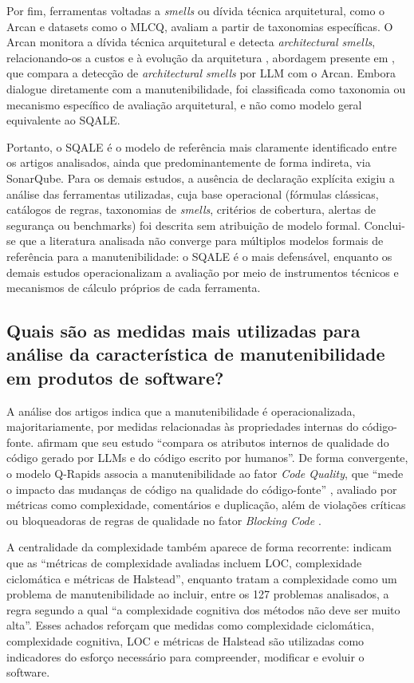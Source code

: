 Por fim, ferramentas voltadas a \textit{smells} ou dívida técnica arquitetural, como o Arcan e datasets como o MLCQ, avaliam a partir de taxonomias específicas. O Arcan monitora a dívida técnica arquitetural e detecta \textit{architectural smells}, relacionando-os a custos e à evolução da arquitetura \cite{arcan2025}, abordagem presente em , que compara a detecção de \textit{architectural smells} por LLM com o Arcan. Embora dialogue diretamente com a manutenibilidade, foi classificada como taxonomia ou mecanismo específico de avaliação arquitetural, e não como modelo geral equivalente ao SQALE.

Portanto, o SQALE é o modelo de referência mais claramente identificado entre os artigos analisados, ainda que predominantemente de forma indireta, via SonarQube. Para os demais estudos, a ausência de declaração explícita exigiu a análise das ferramentas utilizadas, cuja base operacional (fórmulas clássicas, catálogos de regras, taxonomias de \textit{smells}, critérios de cobertura, alertas de segurança ou benchmarks) foi descrita sem atribuição de modelo formal. Conclui-se que a literatura analisada não converge para múltiplos modelos formais de referência para a manutenibilidade: o SQALE é o mais defensável, enquanto os demais estudos operacionalizam a avaliação por meio de instrumentos técnicos e mecanismos de cálculo próprios de cada ferramenta.

\subsection{Quais são as medidas mais utilizadas para análise da característica de manutenibilidade em produtos de software?}

A análise dos artigos indica que a manutenibilidade é operacionalizada, majoritariamente, por medidas relacionadas às propriedades internas do código-fonte.  afirmam que seu estudo ``compara os atributos internos de qualidade do código gerado por LLMs e do código escrito por humanos''. De forma convergente, o modelo Q-Rapids associa a manutenibilidade ao fator \textit{Code Quality}, que ``mede o impacto das mudanças de código na qualidade do código-fonte'' \cite[p.~10, tradução nossa]{qrapids2019}, avaliado por métricas como complexidade, comentários e duplicação, além de violações críticas ou bloqueadoras de regras de qualidade no fator \textit{Blocking Code} \cite[p.~5]{qrapids2019}.

A centralidade da complexidade também aparece de forma recorrente:  indicam que as ``métricas de complexidade avaliadas incluem LOC, complexidade ciclomática e métricas de Halstead'', enquanto  tratam a complexidade como um problema de manutenibilidade ao incluir, entre os 127 problemas analisados, a regra segundo a qual ``a complexidade cognitiva dos métodos não deve ser muito alta''. Esses achados reforçam que medidas como complexidade ciclomática, complexidade cognitiva, LOC e métricas de Halstead são utilizadas como indicadores do esforço necessário para compreender, modificar e evoluir o software.

